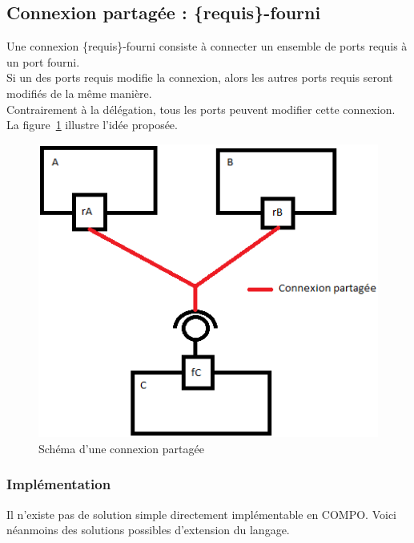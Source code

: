 \documentclass[11pt,a4paper,openany,oneside]{book}
\begin{document}
\subsection{Connexion partagée : \{requis\}-fourni}
\label{connexionPartageeRef}
Une connexion \{requis\}-fourni consiste à connecter un ensemble de ports requis à un port fourni.\\ 
Si un des ports requis modifie la connexion, alors les autres ports requis seront modifiés de la même manière.\\
Contrairement à la délégation, tous les ports peuvent modifier cette connexion. La figure~\ref{connexionPartagee} illustre l'idée proposée.
\begin{figure}[H]
\centering
\includegraphics[scale=0.7, keepaspectratio=true]{connexionPartagee.png}
\caption{Schéma d'une connexion partagée}
\label{connexionPartagee}
\end{figure}

\subsubsection{Implémentation}
Il n'existe pas de solution simple directement implémentable en COMPO. Voici néanmoins des solutions possibles d'extension du langage.
\end{document}
